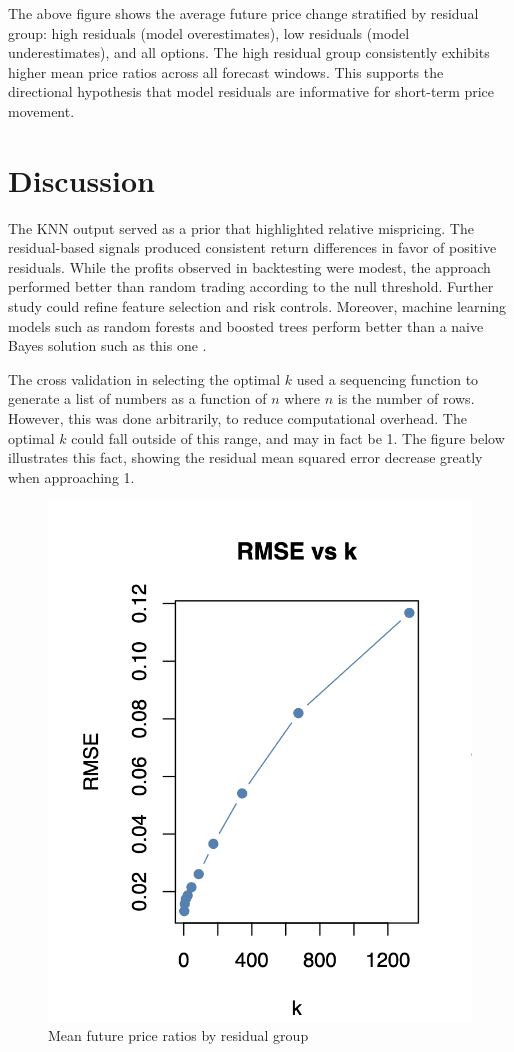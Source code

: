 \documentclass{article}
\begin{document}
The above figure shows the average future price change stratified by residual group: high residuals (model overestimates), low residuals (model underestimates), and all options. The high residual group consistently exhibits higher mean price ratios across all forecast windows. This supports the directional hypothesis that model residuals are informative for short-term price movement.

\section{Discussion}
The KNN output served as a prior that highlighted relative mispricing. The residual-based signals produced consistent return differences in favor of positive residuals. While the profits observed in backtesting were modest, the approach performed better than random trading according to the null threshold. Further study could refine feature selection and risk controls. Moreover, machine learning models such as random forests and boosted trees perform better than a naive Bayes solution such as this one \citep{caruana2006empirical}.

The cross validation in selecting the optimal $k$ used a sequencing function to generate a list of numbers as a function of $n$ where $n$ is the number of rows. However, this was done arbitrarily, to reduce computational overhead. The optimal $k$ could fall outside of this range, and may in fact be 1. The figure below illustrates this fact, showing the residual mean squared error decrease greatly when approaching 1.

\begin{figure}[h]
  \centering
  \includegraphics[width=0.8\linewidth]{data/results/knn_rmse.png}
  \caption{Mean future price ratios by residual group}
  \label{fig:price-diff}
\end{figure}
\end{document}
